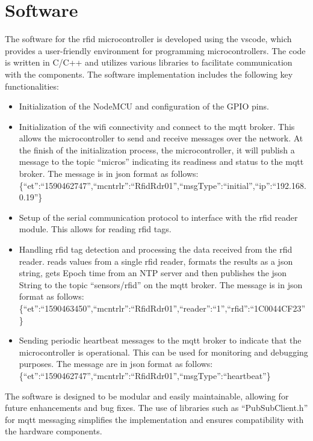 \section{Software}
The software for the \gls{rfid} microcontroller is developed using the \gls{vscode}, which provides a user-friendly environment for programming microcontrollers. The code is written in C/C++ and utilizes various libraries to facilitate communication with the components.
The software implementation includes the following key functionalities:
\begin{itemize}
  \item Initialization of the NodeMCU and configuration of the GPIO pins.
  \item Initialization of the \gls{wifi} connectivity and connect to the \gls{mqtt} broker. This allows the microcontroller to send and receive messages over the network.
  At the finish of the initialization process, the microcontroller, it will publish a message to the topic ``micros'' indicating its readiness and status to the \gls{mqtt} broker. The message is in \gls{json} format as follows:\\
  \{``et'':``1590462747'',``mcntrlr'':``RfidRdr01'',``msgType'':``initial'',``ip'':``192.168.0.19''\}
\item Setup of the serial communication protocol to interface with the \gls{rfid} reader module. This allows for reading \gls{rfid} tags.
\item Handling \gls{rfid} tag detection and processing the data received from the \gls{rfid} reader. reads values from a single \gls{rfid} reader, formats the results as a \gls{json} string, gets Epoch time from an NTP server and then publishes the \gls{json} String to the topic ``sensors/rfid'' on the \gls{mqtt} broker. The message is in \gls{json} format as follows:\\
\{``et'':``1590463450'',``mcntrlr'':``RfidRdr01'',``reader'':``1'',``rfid'':``1C0044CF23''\}
\item Sending periodic heartbeat messages to the \gls{mqtt} broker to indicate that the microcontroller is operational. This can be used for monitoring and debugging purposes. The message are in \gls{json} format as follows:\\
\{``et'':``1590462747'',``mcntrlr'':``RfidRdr01'',``msgType'':``heartbeat''\}
\end{itemize}
The software is designed to be modular and easily maintainable, allowing for future enhancements and bug fixes. The use of libraries such as ``PubSubClient.h'' for \gls{mqtt} messaging simplifies the implementation and ensures compatibility with the hardware components.
